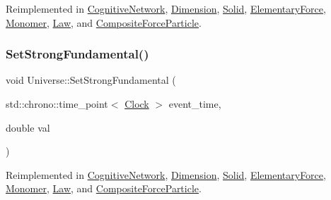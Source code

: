 Reimplemented in \mbox{\hyperlink{classCognitiveNetwork_a50f2a12c9873e623d6247318b041ba30}{Cognitive\+Network}}, \mbox{\hyperlink{classDimension_ab9021cb6727ed590026bf870c638576d}{Dimension}}, \mbox{\hyperlink{classSolid_a478e15cdf15c5bb01cbcbd5f584ef83a}{Solid}}, \mbox{\hyperlink{classElementaryForce_aa1b5708cfab2069049fec5c924e1f246}{Elementary\+Force}}, \mbox{\hyperlink{classMonomer_a10b864f6bcad43f11a2316dbbe4c4742}{Monomer}}, \mbox{\hyperlink{classLaw_a4cd0dd1908edbd02090dd1ba1387d722}{Law}}, and \mbox{\hyperlink{classCompositeForceParticle_a06488ef0457335648b161d3ed746b643}{Composite\+Force\+Particle}}.

\mbox{\label{classUniverse_aafec97a231126b71c73ac1258609a284}} 
\subsubsection{\texorpdfstring{Set\+Strong\+Fundamental()}{SetStrongFundamental()}}
{\footnotesize\ttfamily void Universe\+::\+Set\+Strong\+Fundamental (\begin{DoxyParamCaption}\item[{std\+::chrono\+::time\+\_\+point$<$ \mbox{\hyperlink{universe_8h_a0ef8d951d1ca5ab3cfaf7ab4c7a6fd80}{Clock}} $>$}]{event\+\_\+time,  }\item[{double}]{val }\end{DoxyParamCaption})\hspace{0.3cm}{\ttfamily [virtual]}}



Reimplemented in \mbox{\hyperlink{classCognitiveNetwork_ac54286eea279f5caa98b642b9084fd55}{Cognitive\+Network}}, \mbox{\hyperlink{classDimension_a2de864aaa4b1074684395dbe928468c1}{Dimension}}, \mbox{\hyperlink{classSolid_a4342786a7785b1a3816d20de02105bcf}{Solid}}, \mbox{\hyperlink{classElementaryForce_afb00e9a10ec33eeb1daefce39b0468b7}{Elementary\+Force}}, \mbox{\hyperlink{classMonomer_ad9df06c1a8264bfdb514ef3ba04ef4c7}{Monomer}}, \mbox{\hyperlink{classLaw_a4a7c8caa24acf453c1a8782a1ec4acf4}{Law}}, and \mbox{\hyperlink{classCompositeForceParticle_a28d835658edcbecf60162475a8cb1ab6}{Composite\+Force\+Particle}}.

\mbox{\label{classUniverse_a1b2d6197ddf3d613cc30bd04d22ed8b7}} 
